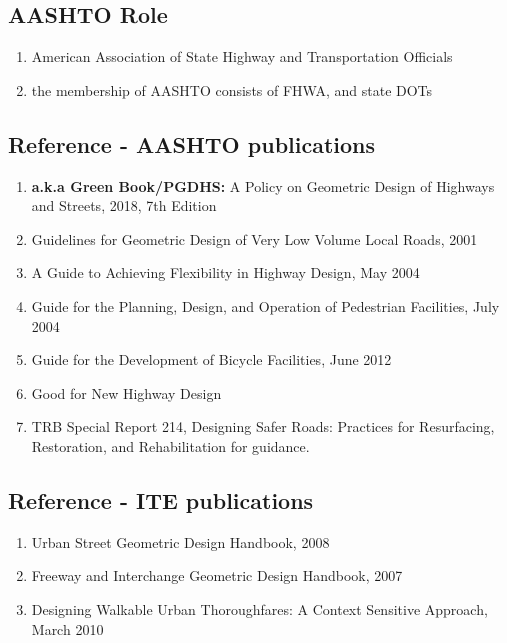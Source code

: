 \documentclass{article}
\begin{document}
  \subsection{AASHTO Role}
  \begin{enumerate}
    \item American Association of State Highway and Transportation Officials
    \item the membership of AASHTO consists of FHWA, and state DOTs
  \end{enumerate}

  \subsection{Reference - AASHTO publications}
  \begin{enumerate}
    \item \textbf{a.k.a Green Book/PGDHS:} A Policy on Geometric Design of Highways and Streets, 2018, 7th Edition
    \item Guidelines for Geometric Design of Very Low Volume Local Roads, 2001
    \item A Guide to Achieving Flexibility in Highway Design, May 2004
    \item Guide for the Planning, Design, and Operation of Pedestrian Facilities, July 2004
    \item Guide for the Development of Bicycle Facilities, June 2012

    \item Good for New Highway Design 
    \item TRB Special Report 214, Designing Safer Roads: Practices for Resurfacing, Restoration, and Rehabilitation for guidance. \\
  \end{enumerate}

  \subsection{Reference - ITE publications}
  \begin{enumerate}
    \item Urban Street Geometric Design Handbook, 2008
    \item Freeway and Interchange Geometric Design Handbook, 2007
    \item Designing Walkable Urban Thoroughfares: A Context Sensitive Approach, March 2010
  \end{enumerate}
\end{document}

